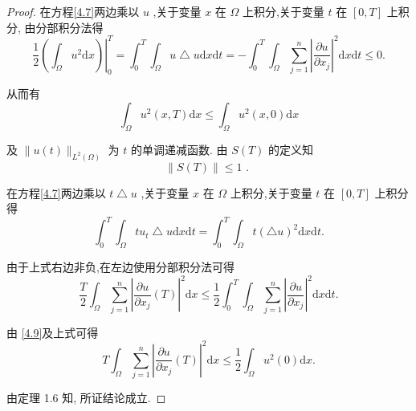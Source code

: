 \documentclass[lang=cn,newtx,10pt,scheme=chinese,thmcnt=chapter]{elegantbook}
\newcommand{\dif}{\mathrm{d}}
\begin{document}
\begin{proof}
    在方程\ref{4.7}两边乘以 \(u\) ,关于变量 \(x\) 在 \(\Omega\) 上积分,关于变量 \(t\) 在 \(\left\lbrack  {0,T}\right\rbrack\) 上积分, 由分部积分法得
\begin{equation}
{\left. \frac{1}{2}\left( {\int }_{\Omega }{u}^{2}\dif x\right) \right| }_{0}^{T} = {\int }_{0}^{T}{\int }_{\Omega }u\bigtriangleup {u\dif x\dif t} =  - {\int }_{0}^{T}{\int }_{\Omega }\mathop{\sum }\limits_{{j = 1}}^{n}{\left| \frac{\partial u}{\partial {x}_{j}}\right| }^{2}{\dif x\dif t} \leqslant  0. \label{4.9}
\end{equation}

从而有
\begin{equation*}
{\int }_{\Omega }{u}^{2}\left( {x,T}\right) {\dif x} \leqslant  {\int }_{\Omega }{u}^{2}\left( {x,0}\right) {\dif x}
\end{equation*}

及 \(\parallel u\left( t\right) {\parallel }_{{L}^{2}\left( \Omega \right) }\) 为 \(t\) 的单调递减函数. 由 \(S\left( T\right)\) 的定义知
\begin{equation}
\parallel S\left( T\right) \parallel  \leqslant  1\text{ . } \label{4.10}
\end{equation}

在方程\ref{4.7}两边乘以 \(t\bigtriangleup u\) ,关于变量 \(x\) 在 \(\Omega\) 上积分,关于变量 \(t\) 在 \(\left\lbrack  {0,T}\right\rbrack\) 上积分得
\begin{equation}
{\int }_{0}^{T}{\int }_{\Omega }t{u}_{t}\bigtriangleup {u\dif x\dif t} = {\int }_{0}^{T}{\int }_{\Omega }t{\left( \bigtriangleup u\right) }^{2}{\dif x\dif t}. \label{4.11}
\end{equation}

由于上式右边非负,在左边使用分部积分法可得
\begin{equation*}
\frac{T}{2}{\int }_{\Omega }\mathop{\sum }\limits_{{j = 1}}^{n}{\left| \frac{\partial u}{\partial {x}_{j}}\left( T\right) \right| }^{2}{\dif x} \leqslant  \frac{1}{2}{\int }_{0}^{T}{\int }_{\Omega }\mathop{\sum }\limits_{{j = 1}}^{n}{\left| \frac{\partial u}{\partial {x}_{j}}\right| }^{2}{\dif x\dif t}.
\end{equation*}

由 \ref{4.9}及上式可得
\begin{equation*}
T{\int }_{\Omega }\mathop{\sum }\limits_{{j = 1}}^{n}{\left| \frac{\partial u}{\partial {x}_{j}}\left( T\right) \right| }^{2}{\dif x} \leqslant  \frac{1}{2}{\int }_{\Omega }{u}^{2}\left( 0\right) {\dif x}.
\end{equation*}

由定理 1.6 知, 所证结论成立.
\end{proof}
\end{document}
